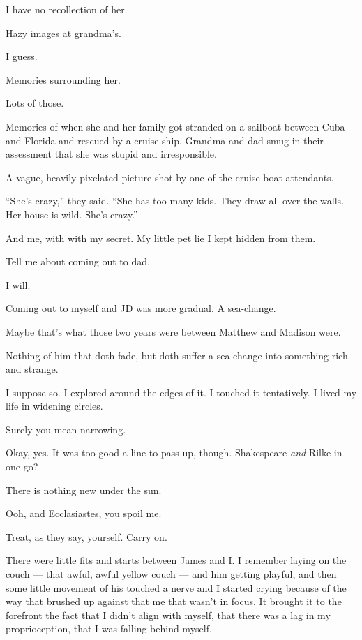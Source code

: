\begin{paracol}{2}
\begin{leftcolumn}
I have no recollection of her.

\begin{ally}
Hazy images at grandma's.
\end{ally}
I guess.

\begin{ally}
Memories surrounding her.
\end{ally}
Lots of those.

\begin{ally}
Memories of when she and her family got stranded on a sailboat between Cuba and Florida and rescued by a cruise ship. Grandma and dad smug in their assessment that she was stupid and irresponsible.
\end{ally}
A vague, heavily pixelated picture shot by one of the cruise boat attendants.

\begin{ally}
``She's crazy,'' they said. ``She has too many kids. They draw all over the walls. Her house is wild. She's crazy.''
\end{ally}
And me, with with my secret. My little pet lie I kept hidden from them.

\begin{ally}
Tell me about coming out to dad.
\end{ally}
I will.
\newpage

\noindent Coming out to myself and JD was more gradual. A sea-change.

\begin{ally}
Maybe that's what those two years were between Matthew and Madison were.
\end{ally}
Nothing of him that doth fade, but doth suffer a sea-change into something rich and strange.

I suppose so. I explored around the edges of it. I touched it tentatively. I lived my life in widening circles.

\begin{ally}
Surely you mean narrowing.
\end{ally}
Okay, yes. It was too good a line to pass up, though. Shakespeare \emph{and} Rilke in one go?

\begin{ally}
There is nothing new under the sun.
\end{ally}
Ooh, and Ecclasiastes, you spoil me.

\begin{ally}
Treat, as they say, yourself. Carry on.
\end{ally}
There were little fits and starts between James and I. I remember laying on the couch --- that awful, awful yellow couch --- and him getting playful, and then some little movement of his touched a nerve and I started crying because of the way that brushed up against that me that wasn't in focus. It brought it to the forefront the fact that I didn't align with myself, that there was a lag in my proprioception, that I was falling behind myself.


\end{leftcolumn}
\end{paracol}
